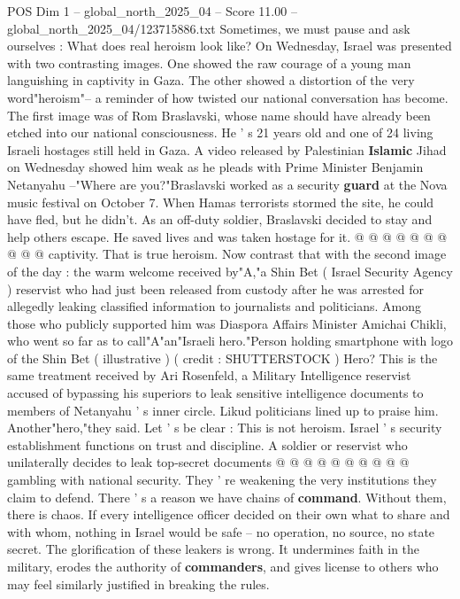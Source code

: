 \begin{textsample}{POS Dim 1 – global\_north\_2025\_04 – Score 11.00 – global\_north\_2025\_04/123715886.txt}  \label{ex:f1_pos_418}
Sometimes, we must pause and ask ourselves : What does real heroism look like?
On Wednesday, Israel was presented with two contrasting images.
One showed the raw courage of a young man languishing in captivity in Gaza.
The other showed a distortion of the very word"heroism"-- a reminder of how twisted our national conversation has become.
The first image was of Rom Braslavski, whose name should have already been etched into our national consciousness.
He ' s 21 years old and one of 24 living Israeli hostages still held in Gaza.
A video released by Palestinian \textbf{Islamic} Jihad on Wednesday showed him weak as he pleads with Prime Minister Benjamin Netanyahu --"Where are you?"Braslavski worked as a security \textbf{guard} at the Nova music festival on October 7.
When Hamas terrorists stormed the site, he could have fled, but he didn't.
As an off-duty soldier, Braslavski decided to stay and help others escape.
He saved lives and was taken hostage for it. @ @ @ @ @ @ @ @ @ @ captivity.
That is true heroism.
Now contrast that with the second image of the day : the warm welcome received by"A,"a Shin Bet ( Israel Security Agency ) reservist who had just been released from custody after he was arrested for allegedly leaking classified information to journalists and politicians.
Among those who publicly supported him was Diaspora Affairs Minister Amichai Chikli, who went so far as to call"A"an"Israeli hero."Person holding smartphone with logo of the Shin Bet ( illustrative ) ( credit : SHUTTERSTOCK ) Hero?
This is the same treatment received by Ari Rosenfeld, a Military Intelligence reservist accused of bypassing his superiors to leak sensitive intelligence documents to members of Netanyahu ' s inner circle.
Likud politicians lined up to praise him.
Another"hero,"they said.
Let ' s be clear : This is not heroism.
Israel ' s security establishment functions on trust and discipline.
A soldier or reservist who unilaterally decides to leak top-secret documents @ @ @ @ @ @ @ @ @ @ gambling with national security.
They ' re weakening the very institutions they claim to defend.
There ' s a reason we have chains of \textbf{command}.
Without them, there is chaos.
If every intelligence officer decided on their own what to share and with whom, nothing in Israel would be safe -- no operation, no source, no state secret.
The glorification of these leakers is wrong.
It undermines faith in the military, erodes the authority of \textbf{commanders}, and gives license to others who may feel similarly justified in breaking the rules.

\end{textsample}
